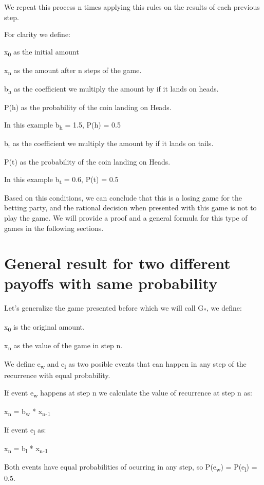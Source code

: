 \documentclass[12pt,reqno]{amsart}
\begin{document}
We repeat this process n times applying this rules on the results of each previous step.


For clarity we define:

x\textsubscript{0} as the initial amount

x\textsubscript{n} as the amount after n steps of the game.

b\textsubscript{h} as the coefficient we multiply the amount by if it lands on heads.

P(h) as the probability of the coin landing on Heads. 

In this example b\textsubscript{h} = 1.5, P(h) = 0.5

b\textsubscript{t} as the coefficient we multiply the amount by if it lands on tails.

P(t) as the probability of the coin landing on Heads. 

In this example b\textsubscript{t} = 0.6, P(t) = 0.5

Based on this conditions, we can conclude that this is a losing game for the betting party, and the rational decision when presented with this game is not to play the game. We will provide a proof and a general formula for this type of games in the following sections.


\section{General result for two different payoffs with same probability}

Let's generalize the game presented before which we will call G\textsubscript{*}, we define:

x\textsubscript{0} is the original amount.

x\textsubscript{n} as the value of the game in step n.

We define e\textsubscript{w} and e\textsubscript{l} as two posible events that can happen in any step of the recurrence with equal probability.

If event e\textsubscript{w} happens at step n we calculate the value of  recurrence at step n as:

x\textsubscript{n} = b\textsubscript{w} * x\textsubscript{n-1}

If event e\textsubscript{l} as: 

x\textsubscript{n} = b\textsubscript{l} * x\textsubscript{n-1}

Both events have equal probabilities of ocurring in any step, so P(e\textsubscript{w}) = P(e\textsubscript{l}) = 0.5. 
\end{document}
